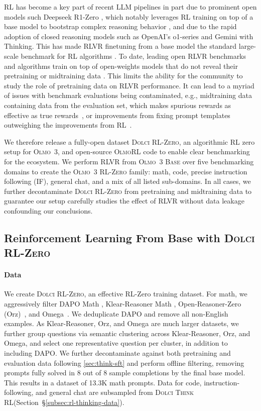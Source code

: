 \documentclass[table]{ai2style/ai2}
\newcommand{\newOlmo}{Olmo\xspace}
\newcommand{\olmothree}{\textsc{\newOlmo~3}\xspace}
\newcommand{\olmothreebase}{\textsc{\newOlmo~3 Base}\xspace}
\newcommand{\olmothreerl}{\textsc{\newOlmo{}RL}\xspace}
\newcommand{\olmothreerlzero}{\textsc{\newOlmo~3 RL-Zero}\xspace}
\newcommand{\dolcithinkrl}{\textsc{Dolci Think RL}\xspace}
\newcommand{\dolcirlzero}{\textsc{Dolci RL-Zero}\xspace}
\begin{document}
{{RL has become a key part of recent LLM pipelines in part due to prominent open models such Deepseek R1-Zero \citep{guo2025deepseek}, which notably leverages RL training on top of a base model to bootstrap complex reasoning behavior \citep{marjanović2025deepseekr1thoughtologyletsthink}, and due to the rapid adoption of closed reasoning models such as OpenAI's o1-series and Gemini with Thinking.
This has made RLVR finetuning from a base model the standard large-scale benchmark for RL algorithms \citep{liu2025prorl,yu2025dapo,luo2025deepscaler}.
To date, leading open RLVR benchmarks and algorithms train on top of open-weights models that do not reveal their pretraining or midtraining data \citep{scalingllama3,qwen3}.
This limits the ability for the community to study the role of pretraining data on RLVR performance.
It can lead to a myriad of issues with benchmark evaluations being contaminated, e.g., midtraining data containing data from the evaluation set, which makes spurious rewards as effective as true rewards~\citep{shao2025spuriousrewardsrethinkingtraining,wu2025reasoning}, or improvements from fixing prompt templates outweighing the improvements from RL~\citep{liu2025understanding}.

We therefore release a fully-open dataset \dolcirlzero, an algorithmic RL zero setup for \olmothree, and open-source \olmothreerl code to enable clear benchmarking for the ecosystem.
We perform RLVR from \olmothreebase over five benchmarking domains to create the \olmothreerlzero family: math, code, precise instruction following (IF), general chat, and a mix of all listed sub-domains.
In all cases, we further decontaminate \dolcirlzero from pretraining and midtraining data to guarantee our setup carefully studies the effect of RLVR without data leakage confounding our conclusions.

\subsection{Reinforcement Learning From Base with \dolcirlzero}
\label{sub:rlzero-data-setup}

\paragraph{Data}

We create \dolcirlzero, an effective RL-Zero training dataset.
For math, we aggressively filter DAPO Math \citep{yu2025dapo}, Klear-Reasoner Math \citep{su2025klear},  Open-Reasoner-Zero (Orz)~\citep{hu2025open}, and  Omega~\citep{Sun2025OMEGACL}.
We deduplicate DAPO and remove all non-English examples. As Klear-Reasoner, Orz, and Omega are much larger datasets, we further group questions via semantic clustering across Klear-Reasoner, Orz, and Omega, and select one representative question per cluster, in addition to including DAPO.
We further decontaminate against both pretraining and evaluation data following \autoref{sec:think-sft} and perform offline filtering, removing prompts fully solved in 8 out of 8 sample completions by the final base model.
This results in a dataset of 13.3K math prompts. Data for code, instruction-following, and general chat are subsampled from \dolcithinkrl (Section~\S\ref{subsec:rl-thinking-data}).

}}
\end{document}
